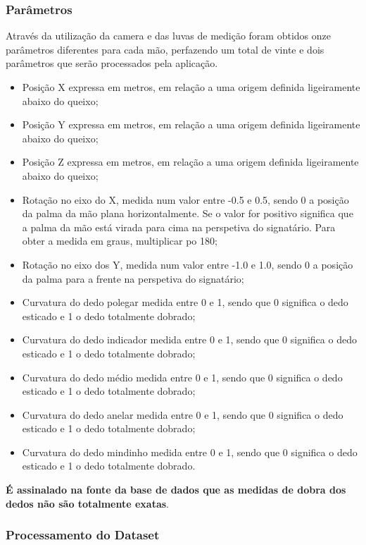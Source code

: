 \documentclass[10pt,a4paper]{article}
\begin{document}
\subsubsection{Parâmetros}

Através da utilização da camera e das luvas de medição foram obtidos onze parâmetros diferentes para cada mão, perfazendo um total de vinte e dois parâmetros que serão processados pela aplicação.

\begin{itemize}
\item Posição X expressa em metros, em relação a uma origem definida ligeiramente abaixo do queixo;
\item Posição Y expressa em metros, em relação a uma origem definida ligeiramente abaixo do queixo;
\item Posição Z expressa em metros, em relação a uma origem definida ligeiramente abaixo do queixo;
\item Rotação no eixo do X, medida num valor entre -0.5 e 0.5, sendo 0 a posição da palma da mão plana horizontalmente. Se o valor for positivo significa que a palma da mão está virada para cima na perspetiva do signatário. Para obter a medida em graus, multiplicar po 180;
\item Rotação no eixo dos Y, medida num valor entre -1.0 e 1.0, sendo 0 a posição da palma para a frente na perspetiva do signatário;
\item Curvatura do dedo polegar medida entre 0 e 1, sendo que 0 significa o dedo esticado e 1 o dedo totalmente dobrado;
\item Curvatura do dedo indicador medida entre 0 e 1, sendo que 0 significa o dedo esticado e 1 o dedo totalmente dobrado;
\item Curvatura do dedo médio medida entre 0 e 1, sendo que 0 significa o dedo esticado e 1 o dedo totalmente dobrado;
\item Curvatura do dedo anelar medida entre 0 e 1, sendo que 0 significa o dedo esticado e 1 o dedo totalmente dobrado;
\item Curvatura do dedo mindinho medida entre 0 e 1, sendo que 0 significa o dedo esticado e 1 o dedo totalmente dobrado.
\end{itemize}
\textbf{É assinalado na fonte da base de dados que as medidas de dobra dos dedos não são totalmente exatas}.

\subsubsection{Processamento do Dataset}
\end{document}
